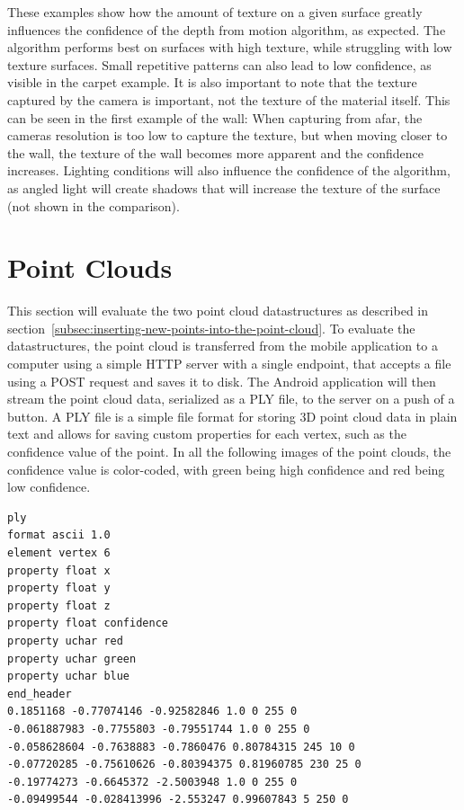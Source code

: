 These examples show how the amount of texture on a given surface greatly influences the confidence of the depth from motion algorithm, as expected.
The algorithm performs best on surfaces with high texture, while struggling with low texture surfaces.
Small repetitive patterns can also lead to low confidence, as visible in the carpet example.
It is also important to note that the texture captured by the camera is important, not the texture of the material itself.
This can be seen in the first example of the wall: When capturing from afar, the cameras resolution is too low to capture the texture,
but when moving closer to the wall, the texture of the wall becomes more apparent and the confidence increases.
Lighting conditions will also influence the confidence of the algorithm,
as angled light will create shadows that will increase the texture of the surface~\cite{google_llc_arcore_doc} (not shown in the comparison).

\section{Point Clouds}\label{sec:point-clouds}
This section will evaluate the two point cloud datastructures as described in section~\ref{subsec:inserting-new-points-into-the-point-cloud}.
To evaluate the datastructures, the point cloud is transferred from the mobile application to a computer using
a simple HTTP server with a single endpoint, that accepts a file using a POST request and saves it to disk.
The Android application will then stream the point cloud data, serialized as a PLY file, to the server on a push of a button.
A PLY file is a simple file format for storing 3D point cloud data in plain text
and allows for saving custom properties for each vertex, such as the confidence value of the point.
In all the following images of the point clouds, the confidence value is color-coded,
with green being high confidence and red being low confidence.

\begin{lstlisting}[caption=Example PLY file]
ply
format ascii 1.0
element vertex 6
property float x
property float y
property float z
property float confidence
property uchar red
property uchar green
property uchar blue
end_header
0.1851168 -0.77074146 -0.92582846 1.0 0 255 0
-0.061887983 -0.7755803 -0.79551744 1.0 0 255 0
-0.058628604 -0.7638883 -0.7860476 0.80784315 245 10 0
-0.07720285 -0.75610626 -0.80394375 0.81960785 230 25 0
-0.19774273 -0.6645372 -2.5003948 1.0 0 255 0
-0.09499544 -0.028413996 -2.553247 0.99607843 5 250 0
\end{lstlisting}

